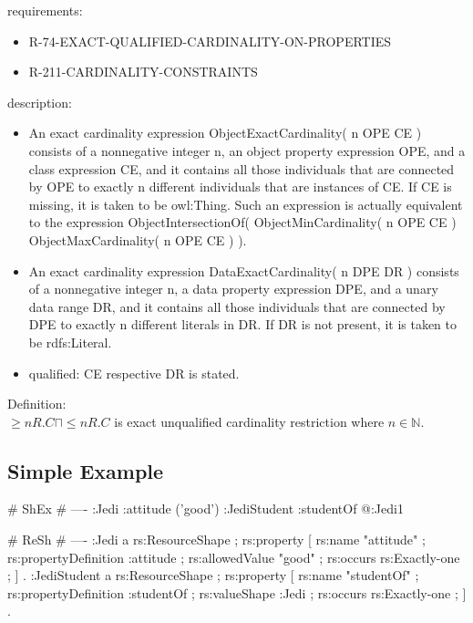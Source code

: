 \documentclass{llncs}
\newcommand{\tb}[1]{\todo[size=\small, color=blue!40]{\textbf{Thomas:} #1}}
\begin{document}
requirements:

\begin{itemize}
	\item R-74-EXACT-QUALIFIED-CARDINALITY-ON-PROPERTIES
	\item R-211-CARDINALITY-CONSTRAINTS
\end{itemize}

description:

\begin{itemize}
	\item An exact cardinality expression ObjectExactCardinality( n OPE CE ) consists of a nonnegative integer n, an object property expression OPE, and a class expression CE, and it contains all those individuals that are connected by OPE to exactly n different individuals that are instances of CE. If CE is missing, it is taken to be owl:Thing. Such an expression is actually equivalent to the expression ObjectIntersectionOf( ObjectMinCardinality( n OPE CE ) ObjectMaxCardinality( n OPE CE ) ).
	\item An exact cardinality expression DataExactCardinality( n DPE DR ) consists of a nonnegative integer n, a data property expression DPE, and a unary data range DR, and it contains all those individuals that are connected by DPE to exactly n different literals in DR. If DR is not present, it is taken to be rdfs:Literal. 
	\item qualified: CE respective DR is stated. 
\end{itemize}

Definition:\\

$\geq n R. C \sqcap \leq n R. C $ is exact unqualified cardinality restriction where $n \in \mathbb{N}$.
\subsection{Simple Example}


\begin{ex}
# ShEx
# ----
:Jedi {
    :attitude ('good') }
:JediStudent {
    :studentOf @:Jedi{1} }
\end{ex}

\begin{ex}
# ReSh
# ----
:Jedi a rs:ResourceShape ;
    rs:property [
        rs:name "attitude" ;
        rs:propertyDefinition :attitude ;
        rs:allowedValue "good" ;
        rs:occurs rs:Exactly-one ;
    ] .
:JediStudent a rs:ResourceShape ;
    rs:property [
        rs:name "studentOf" ;
        rs:propertyDefinition :studentOf ;
        rs:valueShape :Jedi ;
        rs:occurs rs:Exactly-one ;
    ] .
\end{ex}
\end{document}

